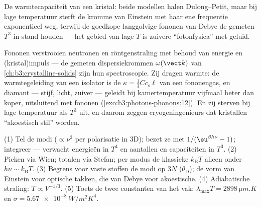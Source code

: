\begin{omfigure}

{\small De warmtecapaciteit van een kristal: beide modellen halen
Dulong--Petit, maar bij lage temperatuur sterft de kromme van Einstein met
haar ene frequentie exponentieel weg, terwijl de goedkope langgolvige
fononen van Debye de gemeten $T^3$ in stand houden --- het gebied van lage
$T$ is zuivere ``fotonfysica'' met geluid.}
\end{omfigure}

\begin{example}\label{ex:b3:photons-phonons:phonon-real}
Fononen verstrooien neutronen en röntgenstraling met behoud van energie en
(kristal)impuls --- de gemeten dispersiekrommen $\omega(\vect k)$ van
\cref{ch:b3:crystalline-solids} zijn hun spectroscopie. Zij dragen warmte:
de warmtegeleiding van een isolator is de $\kappa = \tfrac13 Cc_{\text{s}}\ell$ van een fononengas, en diamant --- stijf, licht, zuiver
--- geleidt bij kamertemperatuur vijfmaal beter dan koper, uitsluitend met
fononen (\cref{exo:b3:photons-phonons:12}). En zij sterven bij lage
temperatuur als $T^3$ uit, en daarom zeggen cryogeningenieurs dat
kristallen ``akoestisch stil'' worden.
\end{example}

\begin{method}\label{met:b3:photons-phonons:method}
(1) Tel de modi ($\propto\nu^2$ per polarisatie in 3D); bezet ze met
$1/(\eu^{\beta h\nu} - 1)$; integreer --- verwacht energieën in $T^4$ en
aantallen en capaciteiten in $T^3$. (2) Pieken via Wien; totalen via
Stefan; per modus de klassieke $k_{\text{B}}T$ alleen onder $h\nu \sim k_{\text{B}}T$. (3) Begrens voor vaste stoffen de modi op $3N$
($\theta_{\text{D}}$); de vorm van Einstein voor optische takken, die van
Debye voor akoestische. (4) Adiabatische straling: $T \propto
V^{-1/3}$.
(5) Toets de twee constanten van het vak: $\lambda_{
\max}T = \qty{2898}{\micro m.K}$ en $\sigma =
\qty{5.67e-8}{W/m^2K^4}$.
\end{method}

